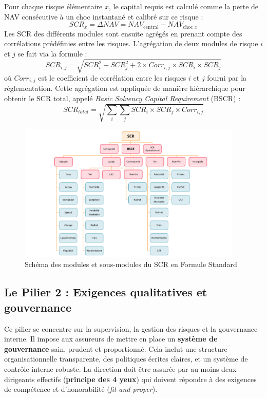 Pour chaque risque élémentaire $x$, le capital requis est calculé comme la perte de NAV consécutive à un choc instantané et calibré sur ce risque :
\begin{equation}
    SCR_{x} = \Delta NAV = NAV_{\text{central}} - NAV_{\text{choc } x}
\end{equation}
Les SCR des différents modules sont ensuite agrégés en prenant compte des corrélations prédéfinies entre les risques. L'agrégation de deux modules de risque $i$ et $j$ se fait via la formule :
\begin{equation}
    SCR_{i,j} = \sqrt{SCR_i^2 + SCR_j^2 + 2 \times Corr_{i,j} \times SCR_i \times SCR_j}
\end{equation}
où $Corr_{i,j}$ est le coefficient de corrélation entre les risques $i$ et $j$ fourni par la réglementation. Cette agrégation est appliquée de manière hiérarchique pour obtenir le SCR total, appelé \textit{Basic Solvency Capital Requirement} (BSCR) :
\begin{equation}
    SCR_{total} = \sqrt{\sum_{i}\sum_{j} SCR_i \times SCR_j \times Corr_{i,j}}
\end{equation}

\begin{figure}[H]
    \centering
    \includegraphics[width=0.95\textwidth]{images/2_chapitres/chapitre1/pieuvre_scr.png}
    \caption{Schéma des modules et sous-modules du SCR en Formule Standard}
    \label{fig:pieuvre_scr}
\end{figure}

\subsection{Le Pilier 2 : Exigences qualitatives et gouvernance}

Ce pilier se concentre sur la supervision, la gestion des risques et la gouvernance interne. Il impose aux assureurs de mettre en place un \textbf{système de gouvernance} sain, prudent et proportionné. Cela inclut une structure organisationnelle transparente, des politiques écrites claires, et un système de contrôle interne robuste. La direction doit être assurée par au moins deux dirigeants effectifs (\textbf{principe des 4 yeux}) qui doivent répondre à des exigences de compétence et d'honorabilité (\textit{fit and proper}).



